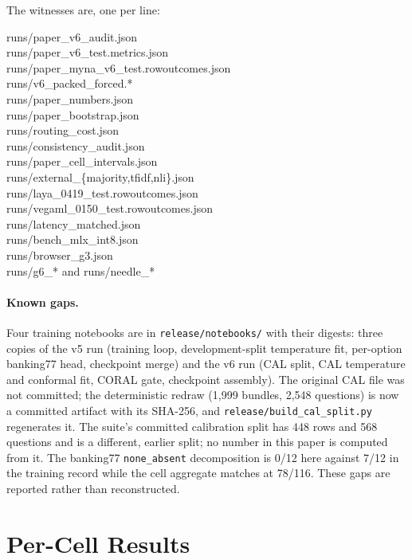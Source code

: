 The witnesses are, one per line:
{\footnotesize\ttfamily\raggedright
runs/paper\_v6\_audit.json \\
runs/paper\_v6\_test.metrics.json \\
runs/paper\_myna\_v6\_test.rowoutcomes.json \\
runs/v6\_packed\_forced.* \\
runs/paper\_numbers.json \\
runs/paper\_bootstrap.json \\
runs/routing\_cost.json \\
runs/consistency\_audit.json \\
runs/paper\_cell\_intervals.json \\
runs/external\_\{majority,tfidf,nli\}.json \\
runs/laya\_0419\_test.rowoutcomes.json \\
runs/vegaml\_0150\_test.rowoutcomes.json \\
runs/latency\_matched.json \\
runs/bench\_mlx\_int8.json \\
runs/browser\_g3.json \\
runs/g6\_* and runs/needle\_* \\
\par}

\paragraph{Known gaps.}
Four training notebooks are in \texttt{release/notebooks/} with their digests: three copies of the
v5 run (training loop, development-split temperature fit, per-option banking77 head, checkpoint
merge) and the v6 run (CAL split, CAL temperature and conformal fit, CORAL gate, checkpoint
assembly). The original CAL file was not committed; the deterministic redraw (1{,}999 bundles,
2{,}548 questions) is now a committed artifact with its SHA-256, and
\texttt{release/build\_cal\_split.py} regenerates it. The suite's committed calibration
split has 448 rows and 568 questions and is a different, earlier split; no number in this paper is
computed from it. The banking77 \texttt{none\_absent}
decomposition is 0/12 here against 7/12 in the training record while the cell aggregate matches at
78/116. These gaps are reported rather than reconstructed.

\section{Per-Cell Results}
\label{app:cells}

